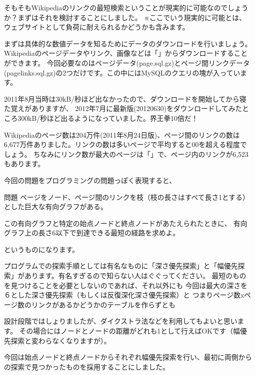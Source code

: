 \documentclass[b5paper]{jsarticle}
\begin{document}
そもそもWikipediaのリンクの最短検索ということが現実的に可能なのでしょうか？まずはそれを検討することにしました。
※ここでいう現実的に可能とは、ウェブサイトとして負荷に耐えられるかどうかも含みます。

まずは具体的な数値データを知るためにデータのダウンロードを行いましょう。
Wikipediaのページデータやリンク、画像などは「」からダウンロードすることができます。
今回必要なのはページデータ(page.sql.gz)とページ間リンクデータ(pagelinks.sql.gz)の2つだけです。この中にはMySQLのクエリの塊が入っています。

2011年8月当時は30kB/秒ほど出なかったので、ダウンロードを開始してから寝た覚えがありますが、
2012年7月に最新版(20120630)をダウンロードしてみたところ300kB/秒ほど出るようになっていました。界王拳10倍だ！

Wikipediaのページ数は204万件(2011年8月24日版)、ページ間のリンクの数は6,677万件ありました。リンクの数は多いページで平均すると00を超える程度でしょう。
ちなみにリンク数が最大のページは「」で、ページ内のリンクが6,523もあります。

今回の問題をプログラミングの問題っぽく表現すると、
\begin{itembox}{問題}
ページをノード、ページ間のリンクを枝（枝の長さはすべて長さ1とする）とした巨大な有向グラフがある。

この有向グラフと特定の始点ノードと終点ノードがあたえられたときに、
有向グラフ上の長さ6以下で到達できる最短の経路を求めよ。
\end{itembox}
というものになります。

プログラムでの探索手順としては有名なものに「深さ優先探索」と「幅優先探索」があります。有名すぎるので知らない人はぐぐってください。
最短のものを見つけることを必要としないのであれば、それ以外にも
今回は最大の深さを６とした深さ優先探索（もしくは反復深化深さ優先探索）と
つまりページ数xページ数のリンクがあるかどうかのテーブルを作らずとも

設計段階ではしょりましたが、ダイクストラ法などを利用してもよいと思います。
その場合にはノードとノードの距離がどれも1として行えばOKです（幅優先探索と変わらなくなりますが）。

今回は始点ノードと終点ノードからそれぞれ幅優先探索を行い、最初に両側からの探索で見つかったものを採用することにしました。
\end{document}
